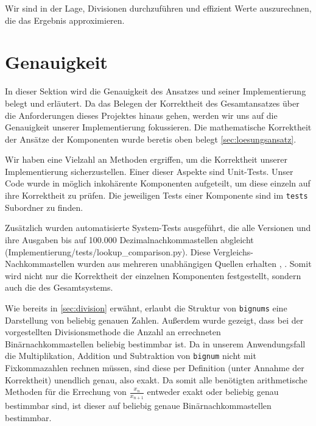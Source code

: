 \documentclass[course=erap]{aspdoc}
\begin{document}
Wir sind in der Lage, Divisionen durchzuführen und effizient Werte auszurechnen, die das Ergebnis approximieren.

\section{Genauigkeit} \label{sec:genauigkeit}
In dieser Sektion wird die Genauigkeit des Ansatzes und seiner Implementierung belegt und erläutert. Da das Belegen der Korrektheit des Gesamtansatzes über die Anforderungen dieses Projektes hinaus gehen, werden wir uns auf die Genauigkeit unserer Implementierung fokussieren. Die mathematische Korrektheit der Ansätze der Komponenten wurde beretis oben belegt \ref{sec:loesungsansatz}.

Wir haben eine Vielzahl an Methoden ergriffen, um die Korrektheit unserer Implementierung sicherzustellen. Einer dieser Aspekte sind Unit-Tests. Unser Code wurde in möglich inkohärente Komponenten aufgeteilt, um diese einzeln auf ihre Korrektheit zu prüfen. Die jeweiligen Tests einer Komponente sind im \texttt{tests} Subordner zu finden.

Zusätzlich wurden automatisierte System-Tests ausgeführt, die alle Versionen und ihre Ausgaben bis auf 100.000 Dezimalnachkommastellen abgleicht (Implementierung/tests/lookup\_comparison.py). Diese Vergleichs-Nachkommastellen wurden aus mehreren unabhängigen Quellen erhalten \cite{sqrt2_Quelle}, \cite{sqrt2_Quelle2}. Somit wird nicht nur die Korrektheit der einzelnen Komponenten festgestellt, sondern auch die des Gesamtsystems.


Wie bereits in \ref{sec:division} erwähnt, erlaubt die Struktur von \texttt{bignums} eine Darstellung von beliebig genauen Zahlen. Außerdem wurde gezeigt, dass bei der vorgestellten Divisionsmethode die Anzahl an errechneten Binärnachkommastellen beliebig bestimmbar ist. Da in unserem Anwendungsfall die Multiplikation, Addition und Subtraktion von \texttt{bignum} nicht mit Fixkommazahlen rechnen müssen, sind diese per Definition (unter Annahme der Korrektheit) unendlich genau, also exakt. Da somit alle benötigten arithmetische Methoden für die Errechung von $\frac{x_n}{x_{n+1}}$ entweder exakt oder beliebig genau bestimmbar sind, ist dieser auf beliebig genaue Binärnachkommastellen bestimmbar.
\end{document}
